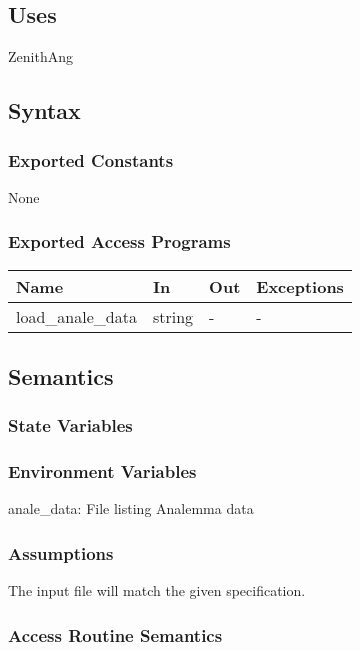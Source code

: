 \documentclass[12pt, titlepage]{article}
\begin{document}
\subsection{Uses}
ZenithAng


\subsection{Syntax}

\subsubsection{Exported Constants}
None

\subsubsection{Exported Access Programs}

\begin{center}
\begin{tabular}{p{3cm} p{3cm} p{3cm} p{2cm}}
\hline
\textbf{Name} & \textbf{In} & \textbf{Out} & \textbf{Exceptions} \\
\hline 
load\_anale\_data & string & - & -\\


\hline
\end{tabular}
\end{center}


\subsection{Semantics}

\subsubsection{State Variables}



\subsubsection{Environment Variables}

anale\_data: File listing Analemma data


\subsubsection{Assumptions}
The input file will match the given specification.

\subsubsection{ Access Routine Semantics}
\end{document}
